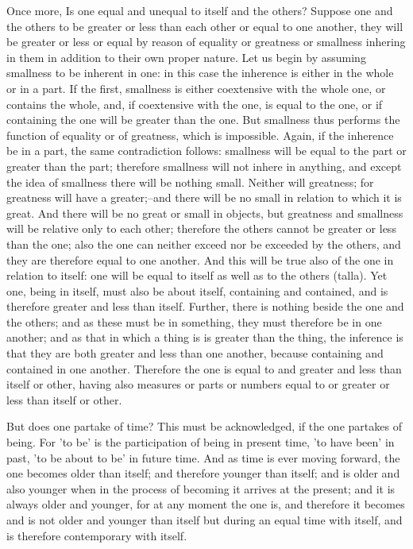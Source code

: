 Once more, Is one equal and unequal to itself and the others? Suppose
one and the others to be greater or less than each other or equal to one
another, they will be greater or less or equal by reason of equality or
greatness or smallness inhering in them in addition to their own proper
nature. Let us begin by assuming smallness to be inherent in one: in
this case the inherence is either in the whole or in a part. If the
first, smallness is either coextensive with the whole one, or contains
the whole, and, if coextensive with the one, is equal to the one, or
if containing the one will be greater than the one. But smallness thus
performs the function of equality or of greatness, which is impossible.
Again, if the inherence be in a part, the same contradiction follows:
smallness will be equal to the part or greater than the part; therefore
smallness will not inhere in anything, and except the idea of smallness
there will be nothing small. Neither will greatness; for greatness will
have a greater;--and there will be no small in relation to which it is
great. And there will be no great or small in objects, but greatness
and smallness will be relative only to each other; therefore the others
cannot be greater or less than the one; also the one can neither exceed
nor be exceeded by the others, and they are therefore equal to one
another. And this will be true also of the one in relation to itself:
one will be equal to itself as well as to the others (talla). Yet one,
being in itself, must also be about itself, containing and contained,
and is therefore greater and less than itself. Further, there is nothing
beside the one and the others; and as these must be in something, they
must therefore be in one another; and as that in which a thing is is
greater than the thing, the inference is that they are both greater and
less than one another, because containing and contained in one another.
Therefore the one is equal to and greater and less than itself or other,
having also measures or parts or numbers equal to or greater or less
than itself or other.

But does one partake of time? This must be acknowledged, if the one
partakes of being. For 'to be' is the participation of being in present
time, 'to have been' in past, 'to be about to be' in future time. And
as time is ever moving forward, the one becomes older than itself; and
therefore younger than itself; and is older and also younger when in the
process of becoming it arrives at the present; and it is always older
and younger, for at any moment the one is, and therefore it becomes
and is not older and younger than itself but during an equal time with
itself, and is therefore contemporary with itself.

